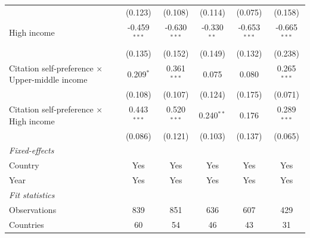 \begin{table}[H]
\begin{tabular}{lccccc}
                                                     & (0.123)                              & (0.108)                                      & (0.114)                     & (0.075)        & (0.158)\\   
      High income                                    & -0.459$^{***}$                       & -0.630$^{***}$                               & -0.330$^{**}$               & -0.653$^{***}$ & -0.665$^{***}$\\   
                                                     & (0.135)                              & (0.152)                                      & (0.149)                     & (0.132)        & (0.238)\\   
      Citation self-preference × Upper-middle income & 0.209$^{*}$                          & 0.361$^{***}$                                & 0.075                       & 0.080          & 0.265$^{***}$\\   
                                                     & (0.108)                              & (0.107)                                      & (0.124)                     & (0.175)        & (0.071)\\   
      Citation self-preference × High income         & 0.443$^{***}$                        & 0.520$^{***}$                                & 0.240$^{**}$                & 0.176          & 0.289$^{***}$\\   
                                                     & (0.086)                              & (0.121)                                      & (0.103)                     & (0.137)        & (0.065)\\   
      \midrule
      \emph{Fixed-effects}\\
      Country                                        & Yes                                  & Yes                                          & Yes                         & Yes            & Yes\\  
      Year                                           & Yes                                  & Yes                                          & Yes                         & Yes            & Yes\\  
      \midrule
      \emph{Fit statistics}\\
      Observations                                   & 839                                  & 851                                          & 636                         & 607            & 429\\  
      Countries                                      & 60                                   & 54                                           & 46                          & 43             & 31\\  

\end{tabular}
\end{table}

